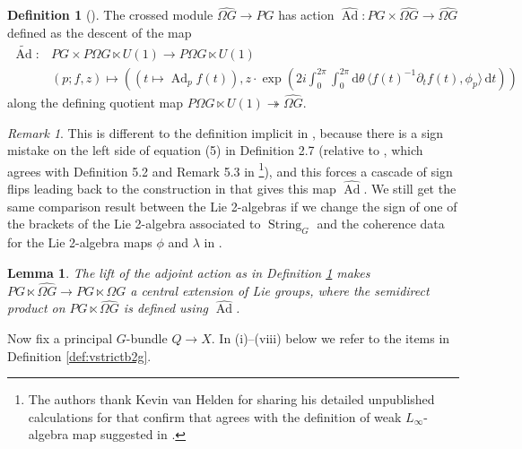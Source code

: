 \documentclass[12pt]{amsart}
\DeclareMathOperator{\Ad}{Ad}
\DeclareMathOperator{\String}{String}
\theoremstyle{plain}
\newtheorem{lemma}[theorem]{Lemma}
\theoremstyle{definition}
\newtheorem{definition}[theorem]{Definition}
\theoremstyle{remark}
\newtheorem{remark}[theorem]{Remark}
\numberwithin{equation}{section}
\newcommand{\<}{\langle}
\renewcommand{\>}{\rangle}
\newcommand{\intSone}{\int_{0}^{2\pi}\mathrm{d}\theta\,}
\newcommand{\Omegahat}[1]{\widehat{\Omega #1}}
\newcommand{\Adhat}{\widehat{\Ad}}
\begin{document}
\begin{definition}[{\cite[proof of Proposition 3.1]{BSCS}}]\label{def:string_xmod}
The crossed module $\Omegahat{G} \to PG$ has action $\Adhat\colon PG\times \Omegahat{G} \to \Omegahat{G}$ defined  as the descent of the map
\begin{align}\label{eq:lifted_Ad}
  \widetilde{\Ad}\colon & PG \times P\Omega G \ltimes U(1) \to P\Omega G \ltimes U(1) \nonumber \\
  &(p;f,z) \mapsto \left((t\mapsto \Ad_pf(t)), z\cdot \exp\left(2i\int_0^{2\pi} \intSone \langle f(t)^{-1}\partial_t f(t), \phi_p \rangle\, \mathrm{d}t\right)\right)
\end{align}
along the defining quotient map $P\Omega G \ltimes U(1) \twoheadrightarrow \Omegahat{G}$.
\end{definition}

\begin{remark}\label{rem:BCSS_error}
This is different to the definition implicit in \cite[Proposition 3.1]{BSCS}, because there is a sign mistake on the left side of equation (5) in Definition 2.7 (relative to  \cite[Definition 4.3.4]{HDA6}, which agrees with Definition 5.2 and Remark 5.3 in \cite{Lada-Markl_95}\footnote{The authors thank Kevin van Helden for sharing his detailed unpublished calculations for \cite{vanHelden_21} that confirm that \cite[Definition 4.34]{HDA6} agrees with the definition of weak $L_\infty$-algebra map suggested in \cite{Lada-Markl_95}.}), and this forces a cascade of sign flips leading back to the construction in \cite[Proposition 3.1]{BSCS} that gives this map $\Adhat$. 
We still get the same comparison result between the Lie 2-algebras if we change the sign of one of the brackets of the Lie 2-algebra associated to $\String_G$ and the coherence data for the Lie 2-algebra maps $\phi$ and $\lambda$ in \cite[Theorem 5.1]{BSCS}.
\end{remark}





\begin{lemma}\label{lemma:central_ext_PG_OmegaG}
The lift of the adjoint action as in Definition \ref{def:string_xmod} makes $PG\ltimes \widehat{\Omega G} \to PG \ltimes \Omega G$ a central extension of Lie groups, where the semidirect product on $PG\ltimes \widehat{\Omega G} $ is defined using $\Adhat$.
\end{lemma}


Now fix a principal $G$-bundle $Q\to X$. In (i)--(viii) below we refer to the items in Definition \ref{def:vstrictb2g}.
\end{document}
